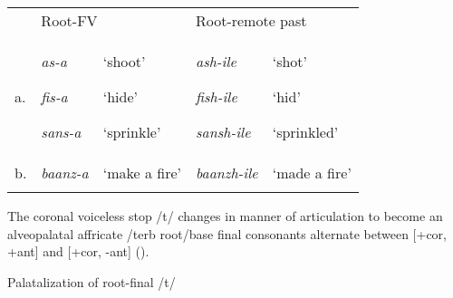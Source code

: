 \documentclass[output=paper]{langsci/langscibook}
\begin{document}
\begin{tabular}{lllll} & \multicolumn{2}{l}{\mdseries Root-FV} & \multicolumn{2}{l}{\mdseries Root-remote past}\\
\lsptoprule
\mdseries a. & {\mdseries \emph{as-a}}

{\mdseries \emph{fis-a}}

\mdseries \emph{sans-a} & {\mdseries ‘shoot’}

{\mdseries ‘hide’}

\mdseries ‘sprinkle’ & {\mdseries \emph{ash-ile}}

{\mdseries \emph{fish-ile}}

\mdseries \emph{sansh-ile} & {\mdseries ‘shot’}

{\mdseries ‘hid’}

\mdseries ‘sprinkled’\\
\mdseries b. & \mdseries \emph{baanz-a} & \mdseries ‘make a fire’ & \mdseries \emph{baanzh-ile} & \mdseries ‘made a fire’\\
\lspbottomrule
\end{tabular}
The coronal voiceless stop /t/ changes in manner of articulation to become an alveopalatal affricate /terb root/base final consonants alternate between [+cor, +ant] and [+cor, -ant] ().

\begin{stylelsTableHeading}%
\begin{table}
\caption{Palatalization of root-final /t/}
\label{tab:10}
\end{table}\end{stylelsTableHeading}
\end{document}
